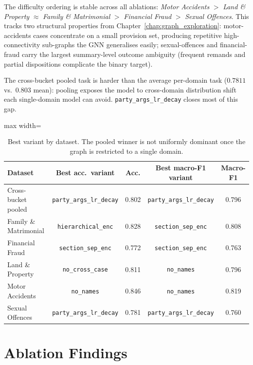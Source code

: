 The difficulty ordering is stable across all ablations: \emph{Motor Accidents} $>$ \emph{Land \& Property} $\approx$ \emph{Family \& Matrimonial} $>$ \emph{Financial Fraud} $>$ \emph{Sexual Offences}. This tracks two structural properties from Chapter~\ref{chap:graph_exploration}: motor-accidents cases concentrate on a small provision set, producing repetitive high-connectivity sub-graphs the GNN generalises easily; sexual-offences and financial-fraud carry the largest summary-level outcome ambiguity (frequent remands and partial dispositions complicate the binary target).

The cross-bucket pooled task is harder than the average per-domain task ($0.7811$ vs.\ $0.803$ mean): pooling exposes the model to cross-domain distribution shift each single-domain model can avoid. \texttt{party\_args\_lr\_decay} closes most of this gap.

\begin{table}[H]
  \centering
  \scriptsize
  \begin{adjustbox}{max width=\textwidth}
  \begin{tabular}{lcccc}
    \toprule
    Dataset & Best acc.\ variant & Acc. & Best macro-F1 variant & Macro-F1 \\
    \midrule
    Cross-bucket pooled & \texttt{party\_args\_lr\_decay} & 0.802 & \texttt{party\_args\_lr\_decay} & 0.796 \\
    Family \& Matrimonial & \texttt{hierarchical\_enc} & 0.828 & \texttt{section\_sep\_enc} & 0.808 \\
    Financial Fraud & \texttt{section\_sep\_enc} & 0.772 & \texttt{section\_sep\_enc} & 0.763 \\
    Land \& Property & \texttt{no\_cross\_case} & 0.811 & \texttt{no\_names} & 0.796 \\
    Motor Accidents & \texttt{no\_names} & 0.846 & \texttt{no\_names} & 0.819 \\
    Sexual Offences & \texttt{party\_args\_lr\_decay} & 0.781 & \texttt{party\_args\_lr\_decay} & 0.760 \\
    \bottomrule
  \end{tabular}
  \end{adjustbox}
  \caption{Best variant by dataset. The pooled winner is not uniformly dominant once the graph is restricted to a single domain.}
  \label{tab:best_variant_by_dataset}
\end{table}

\section{Ablation Findings}
\label{sec:ablation_findings}

